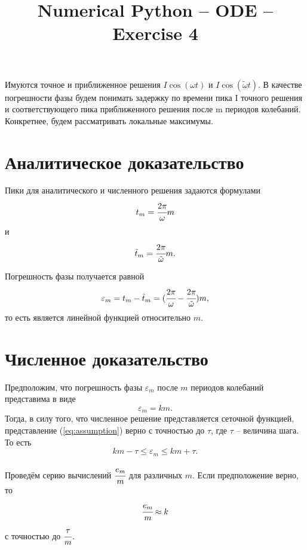 \documentclass{article}
\title{Numerical Python -- ODE -- Exercise 4}
\date{}
\author{}
\begin{document}
\maketitle

Имуются точное и приближенное решения $I\cos(\omega t)$ и $I\cos(\tilde{\omega}t)$. В качестве погрешности фазы будем понимать задержку по времени пика I точного решения и соответствующего пика приближенного решения после m периодов колебаний. Конкретнее, будем рассматривать локальные максимумы.

\section{Аналитическое доказательство}
Пики для аналитического и численного решения задаются формулами
$$t_m=\cfrac{2\pi}{\omega}m$$
и
$$\tilde{t}_m=\cfrac{2\pi}{\tilde{\omega}}m.$$

Погрешность фазы получается равной
$$\varepsilon_m = t_m - \tilde{t}_m=(\cfrac{2\pi}{\omega} - \cfrac{2\pi}{\tilde{\omega}})m,$$
то есть является линейной функцией относительно $m$.

\section{Численное доказательство}
Предположим, что погрешность фазы $\varepsilon_m$ после $m$ периодов колебаний представима в виде
\begin{equation}\label{eq:assumption}
\varepsilon_m = k m.
\end{equation}
Тогда, в силу того, что численное решение представляется сеточной функцией, представление (\ref{eq:assumption}) верно с точностью до $\tau$, где $\tau$ -- величина шага. То есть
\begin{equation}
k m - \tau \leq \varepsilon_m \leq k m + \tau.
\end{equation}

Проведём серию вычислений $\cfrac{e_m}{m}$ для различных $m$. Если предположение верно, то
$$\cfrac{e_m}{m} \approx k$$
с точностью до $\cfrac{\tau}{m}$.
\end{document}
